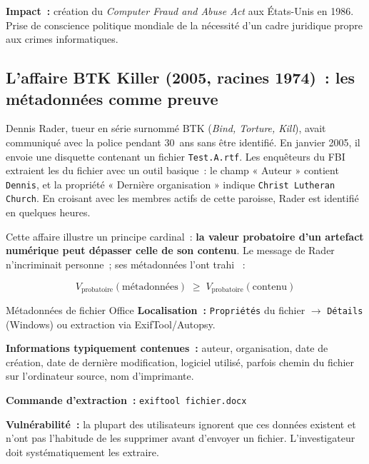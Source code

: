 \textbf{Impact~:} création du \textit{Computer Fraud and Abuse Act} aux
États-Unis en 1986. Prise de conscience politique mondiale de la nécessité
d'un cadre juridique propre aux crimes informatiques.

\subsection{L'affaire BTK Killer (2005, racines 1974)~: les métadonnées comme preuve}

Dennis Rader, tueur en série surnommé BTK (\textit{Bind, Torture, Kill}),
avait communiqué avec la police pendant 30~ans sans être identifié. En
janvier 2005, il envoie une disquette contenant un fichier
\texttt{Test.A.rtf}. Les enquêteurs du FBI extraient les
 du fichier avec un outil basique~:
le champ « Auteur » contient \texttt{Dennis}, et la propriété « Dernière
organisation » indique \texttt{Christ Lutheran Church}. En croisant avec
les membres actifs de cette paroisse, Rader est identifié en quelques
heures.

\medskip

Cette affaire illustre un principe cardinal~: \textbf{la valeur probatoire
d'un artefact numérique peut dépasser celle de son contenu}. Le message
de Rader n'incriminait personne~; ses métadonnées l'ont trahi \cite{chap2pdf}~:

\begin{equation}
V_{\text{probatoire}}(\text{métadonnées}) \;\geq\;
V_{\text{probatoire}}(\text{contenu})
\label{eq:meta-superieur}
\end{equation}

\begin{boxartefact}{Métadonnées de fichier Office}
\textbf{Localisation~:} \texttt{Propriétés} du fichier $\to$
\texttt{Détails} (Windows) ou extraction via ExifTool/Autopsy.

\textbf{Informations typiquement contenues~:} auteur, organisation, date de
création, date de dernière modification, logiciel utilisé, parfois chemin
du fichier sur l'ordinateur source, nom d'imprimante.

\textbf{Commande d'extraction~:}
\lstinline[language=bash_forensique]{exiftool fichier.docx}

\textbf{Vulnérabilité~:} la plupart des utilisateurs ignorent que ces
données existent et n'ont pas l'habitude de les supprimer avant d'envoyer
un fichier. L'investigateur doit systématiquement les extraire.
\end{boxartefact}

